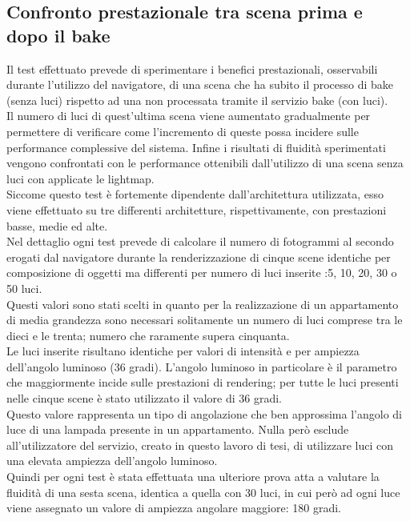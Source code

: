 \subsection{Confronto prestazionale tra scena prima e dopo il bake}
\label{sec:chapter_prove_sperimentali_navigator_confronto_prestazionale}
Il test effettuato prevede di sperimentare i benefici prestazionali, osservabili durante l’utilizzo del navigatore, di una scena che ha subito il processo di bake (senza luci) rispetto ad una non processata tramite il servizio bake (con luci).
\\
Il numero di luci di quest’ultima scena viene aumentato gradualmente per permettere di verificare come l’incremento di queste possa incidere sulle performance complessive del sistema. 
Infine i risultati di fluidità sperimentati vengono confrontati con le performance ottenibili dall’utilizzo di una scena senza luci con applicate le lightmap.
\\
Siccome questo test è fortemente dipendente dall’architettura utilizzata, esso viene effettuato su tre differenti architetture, rispettivamente, con prestazioni basse, medie ed alte.
\\
Nel dettaglio ogni test prevede di calcolare il numero di fotogrammi al secondo erogati dal navigatore durante la renderizzazione di cinque scene identiche per composizione di oggetti ma differenti per numero di luci inserite :5, 10, 20, 30 o 50 luci.
\\
Questi valori sono stati scelti in quanto per la realizzazione di un appartamento di media grandezza sono necessari solitamente un numero di luci comprese tra le dieci e le trenta; numero che raramente supera cinquanta.
\\
Le luci inserite risultano identiche per valori di intensità e per ampiezza dell’angolo luminoso (36 gradi). 
L’angolo luminoso in particolare è il parametro che maggiormente incide sulle prestazioni di rendering; per tutte le luci presenti nelle cinque scene è stato utilizzato il valore di 36 gradi.
\\
Questo valore rappresenta un tipo di angolazione che ben approssima l’angolo di luce di una lampada presente in un appartamento.
Nulla però esclude all’utilizzatore del servizio, creato in questo lavoro di tesi, di utilizzare luci con una elevata ampiezza dell’angolo luminoso.
\\ 
Quindi per ogni test è stata effettuata una ulteriore prova atta a valutare la fluidità di una sesta scena, identica a quella con 30 luci, in cui però ad ogni luce viene assegnato un valore di ampiezza angolare maggiore: 180 gradi.
